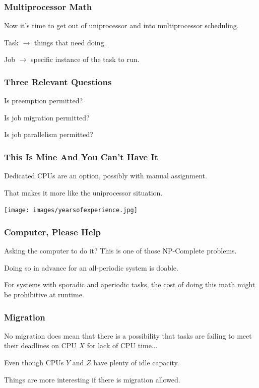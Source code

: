 \begin{frame}
\frametitle{Multiprocessor Math}

Now it's time to get out of uniprocessor and into multiprocessor scheduling.

Task $\rightarrow$ things that need doing.

Job $\rightarrow$ specific instance of the task to run.

\end{frame}

\begin{frame}
\frametitle{Three Relevant Questions}

Is preemption permitted?

Is job migration permitted?

Is job parallelism permitted?

\end{frame}

\begin{frame}
\frametitle{This Is Mine And You Can't Have It}

Dedicated CPUs are an option, possibly with manual assignment. 

That makes it more like the uniprocessor situation.

\begin{center}
	\texttt{[image: images/yearsofexperience.jpg]}
\end{center}

\end{frame}

\begin{frame}
\frametitle{Computer, Please Help}
Asking the computer to do it? This is one of those NP-Complete problems.

Doing so in advance for an all-periodic system is doable.

For systems with sporadic and aperiodic tasks, the cost of doing this math might be prohibitive at runtime. 

\end{frame}

\begin{frame}
\frametitle{Migration}

No migration does mean that there is a possibility that tasks are failing to meet their deadlines on CPU $X$ for lack of CPU time...

Even though CPUs $Y$ and $Z$ have plenty of idle capacity.

Things are more interesting if there is migration allowed.

\end{frame}

